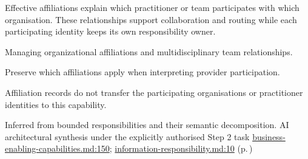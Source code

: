 Effective affiliations explain which practitioner or team participates with which organisation. These relationships support collaboration and routing while each participating identity keeps its own responsibility owner.



Managing organizational affiliations and multidisciplinary team relationships.



Preserve which affiliations apply when interpreting provider participation.



Affiliation records do not transfer the participating organisations or practitioner identities to this capability.


Inferred from bounded responsibilities and their semantic decomposition. AI architectural synthesis under the explicitly authorised Step 2 task \hyperref[evidence:e01893359d483acf]{business-enabling-capabilities.md:150}; \hyperref[evidence:be61392fefb4bb10]{information-responsibility.md:10}
 (p.\,\pageref{cap:bec-practitioner-role})
